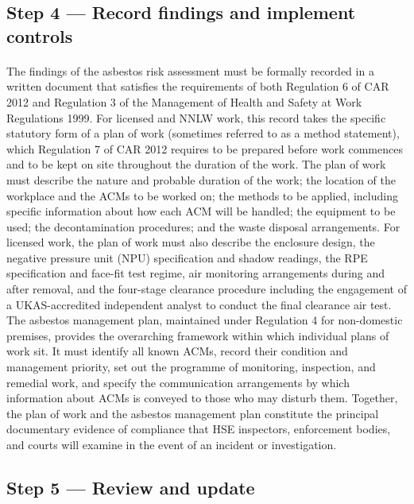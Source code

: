 \subsection{Step 4 — Record findings and implement controls}

\paragraph{}
The findings of the asbestos risk assessment must be formally recorded in a written document that satisfies the requirements of both Regulation 6 of CAR 2012 and Regulation 3 of the Management of Health and Safety at Work Regulations 1999. For licensed and NNLW work, this record takes the specific statutory form of a plan of work (sometimes referred to as a method statement), which Regulation 7 of CAR 2012 requires to be prepared before work commences and to be kept on site throughout the duration of the work. The plan of work must describe the nature and probable duration of the work; the location of the workplace and the ACMs to be worked on; the methods to be applied, including specific information about how each ACM will be handled; the equipment to be used; the decontamination procedures; and the waste disposal arrangements. For licensed work, the plan of work must also describe the enclosure design, the negative pressure unit (NPU) specification and shadow readings, the RPE specification and face-fit test regime, air monitoring arrangements during and after removal, and the four-stage clearance procedure including the engagement of a UKAS-accredited independent analyst to conduct the final clearance air test. The asbestos management plan, maintained under Regulation 4 for non-domestic premises, provides the overarching framework within which individual plans of work sit. It must identify all known ACMs, record their condition and management priority, set out the programme of monitoring, inspection, and remedial work, and specify the communication arrangements by which information about ACMs is conveyed to those who may disturb them. Together, the plan of work and the asbestos management plan constitute the principal documentary evidence of compliance that HSE inspectors, enforcement bodies, and courts will examine in the event of an incident or investigation.

\subsection{Step 5 — Review and update}

